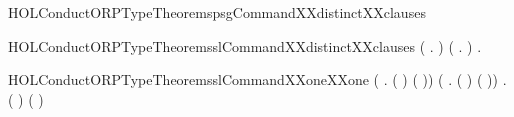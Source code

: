 \newcommand{\HOLConductORPTypeTheoremsplCommandXXdistinctXXclauses}{\UseVerbatim{HOLConductORPTypeTheoremsplCommandXXdistinctXXclauses}}
\begin{SaveVerbatim}{HOLConductORPTypeTheoremspsgCommandXXdistinctXXclauses}
\HOLTokenTurnstile{}  \HOLSymConst{\HOLTokenNotEqual{}} 
\end{SaveVerbatim}
\newcommand{\HOLConductORPTypeTheoremspsgCommandXXdistinctXXclauses}{\UseVerbatim{HOLConductORPTypeTheoremspsgCommandXXdistinctXXclauses}}
\begin{SaveVerbatim}{HOLConductORPTypeTheoremsslCommandXXdistinctXXclauses}
\HOLTokenTurnstile{} (\HOLSymConst{\HOLTokenForall{}} .   \HOLSymConst{\HOLTokenNotEqual{}}  ) \HOLSymConst{\HOLTokenConj{}} (\HOLSymConst{\HOLTokenForall{}} .   \HOLSymConst{\HOLTokenNotEqual{}}  ) \HOLSymConst{\HOLTokenConj{}}
   \HOLSymConst{\HOLTokenForall{}} .   \HOLSymConst{\HOLTokenNotEqual{}}  
\end{SaveVerbatim}
\newcommand{\HOLConductORPTypeTheoremsslCommandXXdistinctXXclauses}{\UseVerbatim{HOLConductORPTypeTheoremsslCommandXXdistinctXXclauses}}
\begin{SaveVerbatim}{HOLConductORPTypeTheoremsslCommandXXoneXXone}
\HOLTokenTurnstile{} (\HOLSymConst{\HOLTokenForall{}} . (  \HOLSymConst{=}  ) \HOLSymConst{\HOLTokenEquiv{}} ( \HOLSymConst{=} )) \HOLSymConst{\HOLTokenConj{}}
   (\HOLSymConst{\HOLTokenForall{}} . (  \HOLSymConst{=}  ) \HOLSymConst{\HOLTokenEquiv{}} ( \HOLSymConst{=} )) \HOLSymConst{\HOLTokenConj{}}
   \HOLSymConst{\HOLTokenForall{}} . (  \HOLSymConst{=}  ) \HOLSymConst{\HOLTokenEquiv{}} ( \HOLSymConst{=} )
\end{SaveVerbatim}
\newcommand{\HOLConductORPTypeTheoremsslCommandXXoneXXone}{\UseVerbatim{HOLConductORPTypeTheoremsslCommandXXoneXXone}}
